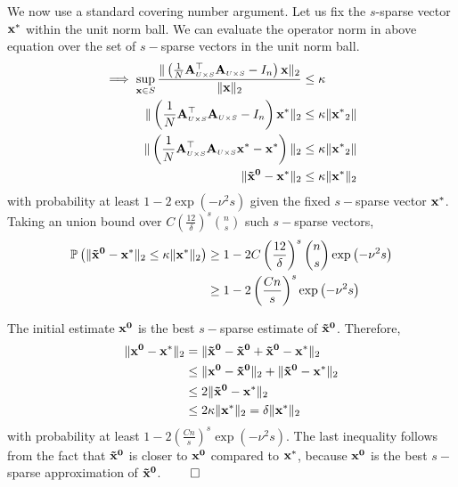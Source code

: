 {We now use a standard covering number argument. Let us fix the $s$-sparse vector $\mathbf{x^*}$ within the unit norm ball. We can evaluate the operator norm in above equation over the set of $s-$sparse vectors in the unit norm ball.
\begin{align*}
\implies \sup_{\mathbf{x} \in S} \frac{\|\left(\frac{1}{N} \mathbf{A}_{\scriptscriptstyle{U\times S}}^\top \mathbf{A}_{\scriptscriptstyle{U\times S}} - I_n\right)\mathbf{x}\|_2}{\|\mathbf{x}\|_2} &\leq \kappa \\
\|\left(\frac{1}{N} \mathbf{A}_{\scriptscriptstyle{U\times S}}^\top \mathbf{A}_{\scriptscriptstyle{U\times S}} - I_n\right)\mathbf{x^*}\|_2 &\leq \kappa \|\mathbf{x^*}_2\| \\
 \|\left(\frac{1}{N} \mathbf{A}_{\scriptscriptstyle{U\times S}}^\top \mathbf{A}_{\scriptscriptstyle{U\times S}}\mathbf{x^*} - \mathbf{x^*}\right)\|_2 &\leq \kappa \|\mathbf{x^*}_2\| \\
 \|\mathbf{\tilde{x}^0} - \mathbf{x^*}\|_2 &\leq \kappa \|\mathbf{x^*}\|_2 
\end{align*}
with probability at least $1 - 2\exp\left(-\nu^2s\right)$ given the fixed $s-$sparse vector $\mathbf{x^*}$. Taking an union bound over $C \left(\frac{12}{\delta}\right)^s \binom{n}{s}$ such $s-$sparse vectors,
\begin{align*}
\mathbb{P}\left(\|\mathbf{\tilde{x}^0} - \mathbf{x^*}\|_2 \leq \kappa \|\mathbf{x^*}\|_2\right) & \geq 1 - 2 C \left(\frac{12}{\delta}\right)^s {n \choose s}\exp\left(-\nu^2s\right) \\ 
& \geq 1 - 2\left(\frac{Cn}{s}\right)^s\exp\left(-\nu^2s\right)
\end{align*}

The initial estimate $\mathbf{x^0}$ is the best $s-$sparse estimate of $\mathbf{\tilde{x}^0}$. Therefore,
\begin{align*}
\|\mathbf{{x}^0} - \mathbf{x^*}\|_2 &=  \|\mathbf{\tilde{x}^0} -\mathbf{\tilde{x}^0} +\mathbf{\tilde{x}^0} - \mathbf{x^*}\|_2 \\
& \leq \|\mathbf{{x}^0} -\mathbf{\tilde{x}^0}\|_2 +  \|\mathbf{\tilde{x}^0} - \mathbf{x^*}\|_2 \\
& \leq 2 \|\mathbf{\tilde{x}^0} - \mathbf{x^*}\|_2 \\
& \leq 2 \kappa \|\mathbf{x^*}\|_2 = \delta \|\mathbf{x^*}\|_2
\end{align*}
with probability at least $1 - 2\left(\frac{Cn}{s}\right)^s\exp\left(-\nu^2s\right)$.
The last inequality follows from the fact that $\mathbf{\tilde{x}^0}$ is closer to $\mathbf{x^0}$ compared to $\mathbf{x^*}$, because $\mathbf{x^0}$ is the best $s-$sparse approximation of $\mathbf{\tilde{x}^0}$. $\qed$}

